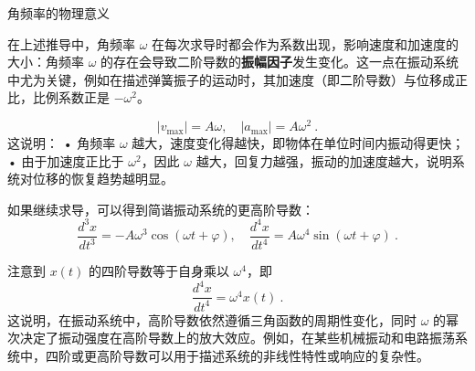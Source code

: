 角频率的物理意义

在上述推导中，角频率 $\omega$ 在每次求导时都会作为系数出现，影响速度和加速度的大小：角频率 $\omega$ 的存在会导致二阶导数的\textbf{振幅因子}发生变化。这一点在振动系统中尤为关键，例如在描述弹簧振子的运动时，其加速度（即二阶导数）与位移成正比，比例系数正是 $-\omega^2$。

\begin{equation}
|v_{\max}| = A\omega, \quad |a_{\max}| = A\omega^2~.
\end{equation}
这说明：
	•	角频率 $\omega$ 越大，速度变化得越快，即物体在单位时间内振动得更快；
	•	由于加速度正比于 $\omega^2$，因此 $\omega$ 越大，回复力越强，振动的加速度越大，说明系统对位移的恢复趋势越明显。


如果继续求导，可以得到简谐振动系统的更高阶导数：
\begin{equation}
\frac{d^3x}{dt^3} = -A\omega^3 \cos(\omega t + \varphi),\quad
\frac{d^4x}{dt^4} = A\omega^4 \sin(\omega t + \varphi)~.
\end{equation}

注意到 $x(t)$ 的四阶导数等于自身乘以 $\omega^4$，即
\begin{equation}
\frac{d^4x}{dt^4} = \omega^4 x(t)~.
\end{equation}
这说明，在振动系统中，高阶导数依然遵循三角函数的周期性变化，同时 $\omega$ 的幂次决定了振动强度在高阶导数上的放大效应。例如，在某些机械振动和电路振荡系统中，四阶或更高阶导数可以用于描述系统的非线性特性或响应的复杂性。
